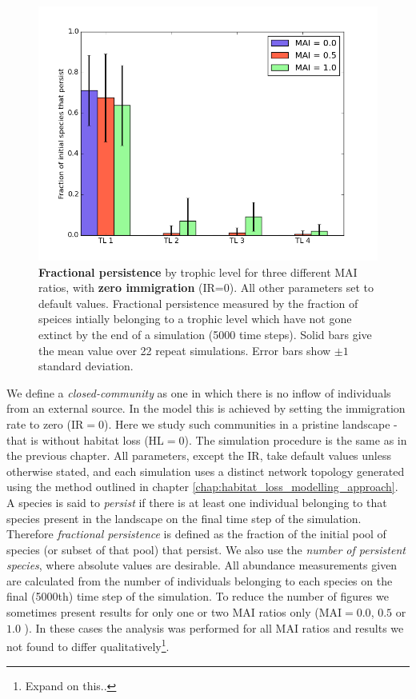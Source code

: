 \begin{figure}
	\centering
	\includegraphics[width=0.8\linewidth]{"figures/persistence/hist_species_per_tl_zeroIR"}
	\caption{\textbf{Fractional persistence} by trophic level for three different MAI ratios, with \textbf{zero immigration} (IR=0). All other parameters set to default values. Fractional persistence measured by the fraction of speices intially belonging to a trophic level which have not gone extinct by the end of a simulation (5000 time steps). Solid bars give the mean value over 22 repeat simulations. Error bars show $\pm 1$ standard deviation.}
	\label{fig:mvp_hist_zeroIR}
\end{figure}

We define a \emph{closed-community} as one in which there is no inflow of individuals from an external source. In the model this is achieved by setting the immigration rate to zero (IR$=0$). Here we study such communities in a pristine landscape - that is without habitat loss (HL$=0$). The simulation procedure is the same as in the previous chapter. All parameters, except the IR, take default values unless otherwise stated, and each simulation uses a distinct network topology generated using the method outlined in chapter \ref{chap:habitat_loss_modelling_approach}. A species is said to \emph{persist} if there is at least one individual belonging to that species present in the landscape on the final time step of the simulation. Therefore \emph{fractional persistence} is defined as the fraction of the initial pool of species (or subset of that pool) that persist. We also use the \emph{number of persistent species}, where absolute values are desirable. All abundance measurements given are calculated from the number of individuals belonging to each species on the final (5000th) time step of the simulation. To reduce the number of figures we sometimes present results for only one or two MAI ratios only (MAI$=0.0$, $0.5$ or $1.0$ ). In these cases the analysis was performed for all MAI ratios and results we not found to differ qualitatively\footnote{Expand on this..}.

